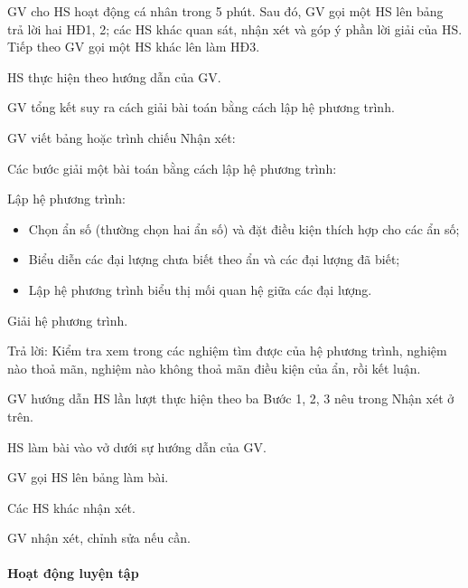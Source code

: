 \begin{tcth}[ttkp]
	\buocmot
	\item GV cho HS hoạt động cá nhân trong 5 phút. Sau đó, GV gọi một HS lên bảng trả lời hai HĐ1, 2; các HS khác quan sát, nhận xét và góp ý phần lời giải của HS. Tiếp theo GV gọi một HS khác lên làm HĐ3. 
	\buochai
	\item HS thực hiện theo hướng dẫn của GV.
	\buocba
	\item GV tổng kết suy ra cách giải bài toán bằng cách lập hệ phương trình.
	\buocbon
	\item GV viết bảng hoặc trình chiếu Nhận xét:
	\begin{nhanxet}
		Các bước giải một bài toán bằng cách lập hệ phương trình:
		\begin{cacbuoc}
			\item Lập hệ phương trình:
			\begin{itemize}
				\item Chọn ẩn số (thường chọn hai ẩn số) và đặt điều kiện thích hợp cho các ẩn số;
				\item Biểu diễn các đại lượng chưa biết theo ẩn và các đại lượng đã biết;
				\item Lập hệ phương trình biểu thị mối quan hệ giữa các đại lượng.
			\end{itemize}
			\item Giải hệ phương trình.
			\item Trả lời: Kiểm tra xem trong các nghiệm tìm được của hệ phương trình, nghiệm nào thoả mãn, nghiệm nào không thoả mãn điều kiện của ẩn, rồi kết luận.
		\end{cacbuoc}
	\end{nhanxet}
\end{tcth}

\begin{tcth}[vidu=1]
	\buocmot
	\item GV hướng dẫn HS lần lượt thực hiện theo ba Bước 1, 2, 3 nêu trong Nhận xét ở trên.
	\buochai
	\item HS làm bài vào vở dưới sự hướng dẫn của GV.
	\item GV gọi HS lên bảng làm bài.
	\buocba
	\item Các HS khác nhận xét. 
	\buocbon
	\item GV nhận xét, chỉnh sửa nếu cần.
\end{tcth}

\paragraph{Hoạt động luyện tập}


